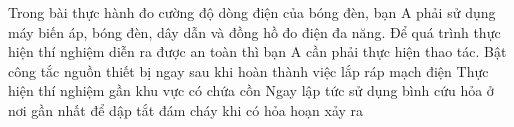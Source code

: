 \begin{ex}
Trong bài thực hành đo cường độ dòng điện của bóng đèn, bạn A phải sử dụng máy biến áp, bóng đèn, dây dẫn và đồng hồ đo điện đa năng. Để quá trình thực hiện thí nghiệm diễn ra được an toàn thì bạn A cần phải thực hiện thao tác.
{Bật công tắc nguồn thiết bị ngay sau khi hoàn thành việc lắp ráp mạch điện}
{Thực hiện thí nghiệm gần khu vực có chứa cồn}
{\True Ngay lập tức sử dụng bình cứu hỏa ở nơi gần nhất để dập tắt đám cháy khi có hỏa hoạn xảy ra}
\loigiai{
\begin{itemchoice}
\itemch 
\itemch 
\itemch 
\itemch 
\end{itemchoice}
}
\end{ex}


